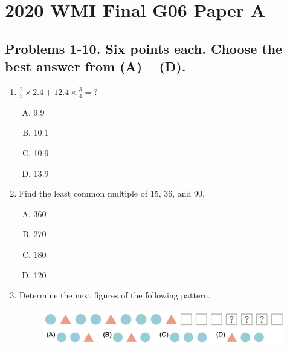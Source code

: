 \documentclass[12pt]{scrartcl}
\begin{document}
\section*{2020 WMI Final G06 Paper A}

\subsection*{Problems 1-10. Six points each. Choose the best answer from (A) -- (D).}

\begin{enumerate}
\item $\frac{2}{3} \times 2.4 + 12.4 \times \frac{3}{4} = ?$
\begin{enumerate}[(A)]
    \item 9.9 \item 10.1 \item 10.9 \item 13.9
\end{enumerate}

\item Find the least common multiple of 15, 36, and 90.
\begin{enumerate}[(A)]
    \item 360 \item 270 \item 180 \item 120
\end{enumerate}

\item Determine the next figures of the following pattern.
\begin{figure}[h]
    \centering
    \includegraphics[scale=0.7]{StarGen/0Figure/wmi-2020-6a-num3.png}
\end{figure}


\end{enumerate}
\end{document}
